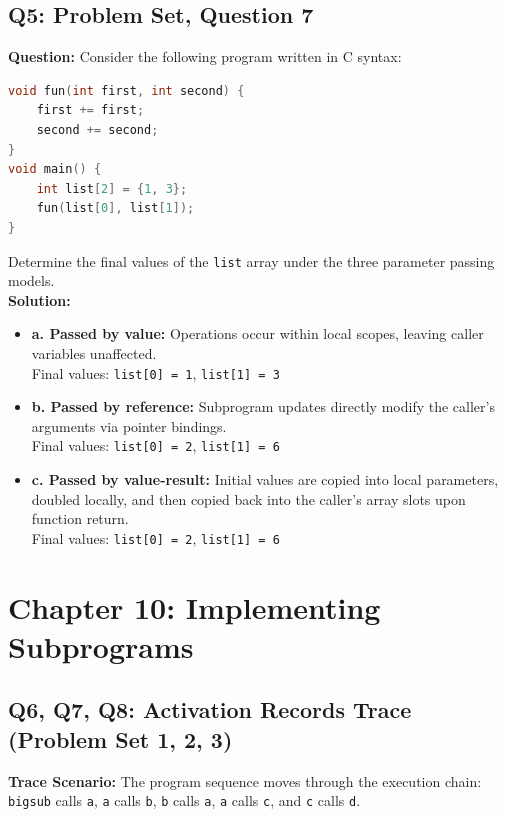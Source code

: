 \documentclass[11pt]{article}
\begin{document}
\subsection{Q5: Problem Set, Question 7}
\textbf{Question:} Consider the following program written in C syntax:
\begin{lstlisting}[language=C]
void fun(int first, int second) {
    first += first;
    second += second;
}
void main() {
    int list[2] = {1, 3};
    fun(list[0], list[1]);
}
\end{lstlisting}
Determine the final values of the \texttt{list} array under the three parameter passing models.\\

\noindent\textbf{Solution:}
\begin{itemize}
    \item \textbf{a. Passed by value:} Operations occur within local scopes, leaving caller variables unaffected. \\ Final values: \texttt{list[0] = 1}, \texttt{list[1] = 3}
    \item \textbf{b. Passed by reference:} Subprogram updates directly modify the caller's arguments via pointer bindings. \\ Final values: \texttt{list[0] = 2}, \texttt{list[1] = 6}
    \item \textbf{c. Passed by value-result:} Initial values are copied into local parameters, doubled locally, and then copied back into the caller's array slots upon function return. \\ Final values: \texttt{list[0] = 2}, \texttt{list[1] = 6}
\end{itemize}

\newpage
\section{Chapter 10: Implementing Subprograms}

\subsection{Q6, Q7, Q8: Activation Records Trace (Problem Set 1, 2, 3)}
\textbf{Trace Scenario:} The program sequence moves through the execution chain: \texttt{bigsub} calls \texttt{a}, \texttt{a} calls \texttt{b}, \texttt{b} calls \texttt{a}, \texttt{a} calls \texttt{c}, and \texttt{c} calls \texttt{d}.
\end{document}
